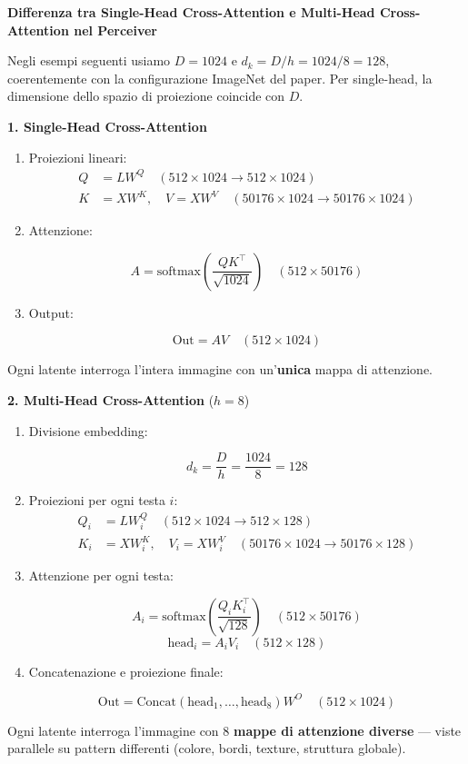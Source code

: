 \documentclass[
  11pt,
]{article}
\begin{document}
\textbf{Differenza tra Single-Head Cross-Attention e Multi-Head
Cross-Attention nel Perceiver}

\begin{notabox}
Negli esempi seguenti usiamo $D = 1024$ e $d_k = D/h = 1024/8 = 128$, coerentemente con la configurazione ImageNet del paper. Per single-head, la dimensione dello spazio di proiezione coincide con $D$.
\end{notabox}

\textbf{1. Single-Head Cross-Attention}
\begin{enumerate}
\item Proiezioni lineari:
\begin{align*}
Q &= L W^Q \quad (512 \times 1024 \to 512 \times 1024) \\
K &= X W^K, \quad V = X W^V \quad (50176 \times 1024 \to 50176 \times 1024)
\end{align*}
\item Attenzione:

\[
A = \text{softmax}\!\left(\frac{QK^\top}{\sqrt{1024}}\right) \quad (512 \times 50176)
\]
\item Output:

\[
\text{Out} = A V \quad (512 \times 1024)
\]
\end{enumerate}
Ogni latente interroga l'intera immagine con un'\textbf{unica} mappa di attenzione.

\textbf{2. Multi-Head Cross-Attention} ($h = 8$)

\begin{enumerate}
\item Divisione embedding:

\[
d_k = \frac{D}{h} = \frac{1024}{8} = 128
\]
\item Proiezioni per ogni testa $i$:
\begin{align*}
Q_i &= L W_i^Q \quad (512 \times 1024 \to 512 \times 128) \\
K_i &= X W_i^K, \quad V_i = X W_i^V \quad (50176 \times 1024 \to 50176 \times 128)
\end{align*}
\item Attenzione per ogni testa:

\[
A_i = \text{softmax}\!\left(\frac{Q_i K_i^\top}{\sqrt{128}}\right) \quad (512 \times 50176)
\]
\[
\text{head}_i = A_i V_i \quad (512 \times 128)
\]
\item Concatenazione e proiezione finale:

\[
\text{Out} = \text{Concat}(\text{head}_1, \ldots, \text{head}_8) W^O \quad (512 \times 1024)
\]
\end{enumerate}
Ogni latente interroga l'immagine con 8 \textbf{mappe di attenzione diverse} --- viste parallele su pattern differenti (colore, bordi, texture, struttura globale).
\end{document}
